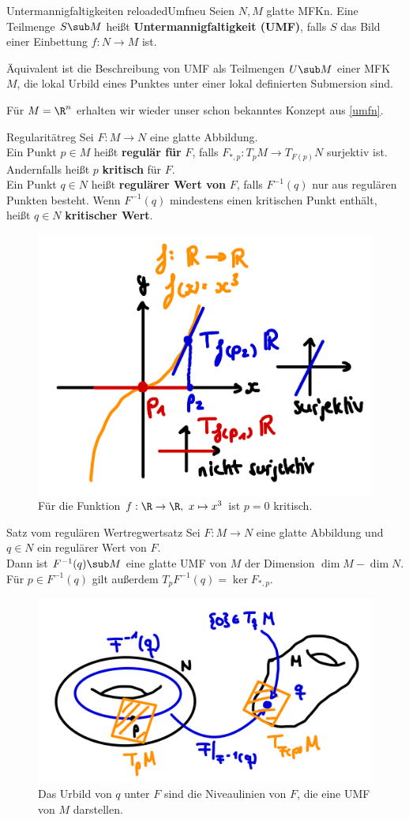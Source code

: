 \begin{definition}{Untermannigfaltigkeiten reloaded}{Umfneu}
Seien $N, M$ glatte MFKn. Eine Teilmenge $S \sub M$ heißt \textbf{Untermannigfaltigkeit (UMF)}, falls $S$ das Bild einer Einbettung $f: N \to M$ ist.
\end{definition}
\begin{bemerkung}
Äquivalent ist die Beschreibung von UMF als Teilmengen $U \sub M$ einer MFK $M$, die lokal Urbild eines Punktes unter einer lokal definierten Submersion sind.
\end{bemerkung}
Für $M=\R^n$ erhalten wir wieder unser schon bekanntes Konzept aus \ref{umfn}.
\begin{definition}{Regularität}{reg}
Sei $F: M \to N$ eine glatte Abbildung.\\
Ein Punkt $p \in M$ heißt \textbf{regulär für} $F$, falls $F_{\ast, p}: T_pM \to T_{F(p)}N$ surjektiv ist. Andernfalls heißt $p$ \textbf{kritisch} für $F$.\\
Ein Punkt $q \in N$ heißt \textbf{regulärer Wert von} $F$, falls $F^{-1}(q)$ nur aus regulären Punkten besteht. Wenn $F^{-1}(q)$ mindestens einen kritischen Punkt enthält, heißt $q \in N$ \textbf{kritischer Wert}.
\end{definition}
\begin{figure}[H]
\label{fig:kritisch}
\centering
\includegraphics[width=0.3\linewidth]{Bilder/bspkritisch.png}
\caption{Für die Funktion $f: \R \to \R, \ x \mapsto x^3$ ist $p=0$ kritisch.}
\end{figure}
\begin{satz}{Satz vom regulären Wert}{regwertsatz}
Sei $F: M \to N$ eine glatte Abbildung und $q \in N$ ein regulärer Wert von $F$.\\
Dann ist $F^{-1}(q) \sub M$ eine glatte UMF von $M$ der Dimension $\dim M - \dim N$. Für $p \in F^{-1}(q)$ gilt außerdem $T_pF^{-1} (q) = \ker F_{\ast, p}$.
\begin{figure}[H]
\label{fig:regulaer}
\centering
\includegraphics[width=0.3\linewidth]{Bilder/regulaer.png}
\caption{Das Urbild von $q$ unter $F$ sind die Niveaulinien von $F$, die eine UMF von $M$ darstellen.}
\end{figure}
\end{satz}
